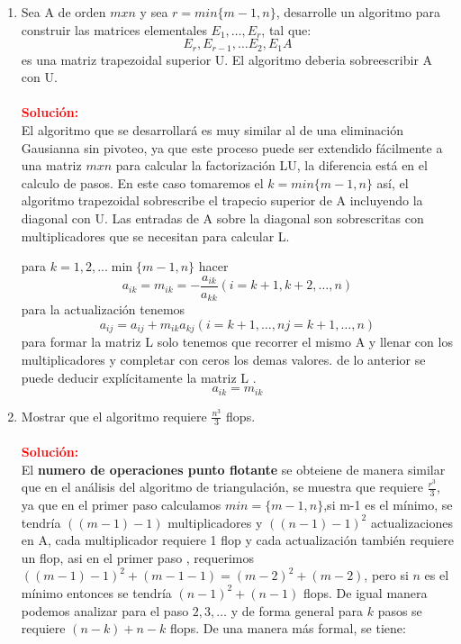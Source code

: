\renewcommand{\labelenumi}{\alph{enumi}}
\begin{enumerate}[label=(\alph*)]
    \item Sea A de orden $mxn$ y sea $r = min\{ m-1,n\}$, desarrolle un algoritmo para construir las matrices elementales $E_1,\dots ,E_r$, tal que:
    \[
	E_r, E_{r-1}, \dots E_2, E_1 A
    \]
    es una matriz trapezoidal superior U. El algoritmo deberia sobreescribir A con U.
    \\\\
    \noindent \textcolor{red}{\bf Solución:}\\    
    El algoritmo que se desarrollará es muy similar al de una eliminación Gausianna sin pivoteo, ya que este proceso puede ser extendido fácilmente a una matriz $mxn$ para calcular la factorización LU, la diferencia está en el calculo de pasos. En este caso tomaremos el $k = min\{m-1,n\}$ así, el algoritmo trapezoidal sobrescribe el trapecio superior de A incluyendo la diagonal con U. Las entradas de A sobre la diagonal son sobrescritas con multiplicadores que se necesitan para calcular L.
	
	para $k = 1,2, ...\min\{m-1, n\}$ hacer
	\[
		a_{ik} = m_{ik} = -\frac{a_{ik}}{a_{kk}}(i = k+1,k+2,\dots ,n)
	\]
	para la actualización tenemos 
	\[
		a_{ij} = a_{ij} + m_{ik} a_{kj}(i = k+1,\dots, n  j = k+1,\dots, n)
	\]		
	para formar la matriz L solo tenemos que recorrer el mismo A y llenar con los multiplicadores y completar con ceros los demas valores. de lo anterior se puede deducir explícitamente la matriz L .
	\[
		a_{ik} = m_{ik}
	\]
	
	\item Mostrar que el algoritmo requiere $\frac{n^3}{3}$ flops.\\\\
	\noindent \textcolor{red}{\bf Solución:}\\    
	El \textbf{numero de operaciones punto flotante} se obteiene de manera similar que en el análisis del algoritmo de triangulación, se muestra que requiere $\frac{r^3}{3}$, ya que en el primer paso calculamos $min=\{m-1,n\}$,si m-1 es el mínimo, se tendría $((m-1)-1)$ multiplicadores  y $((n-1)-1)^2$ actualizaciones  en A, cada multiplicador requiere 1 flop y cada actualización también requiere un flop, asi en el primer paso , requerimos $((m-1)-1)^2+(m-1-1) =(m-2)^2+(m-2)$, pero si $n$ es el mínimo entonces se tendría $(n-1)^2+(n-1)$ flops.
	De igual manera podemos analizar para el paso $2,3, \dots$ y de forma general para $k$ pasos se requiere $(n-k)+ n-k$ flops. De una manera más formal, se tiene:
	

\end{enumerate}
